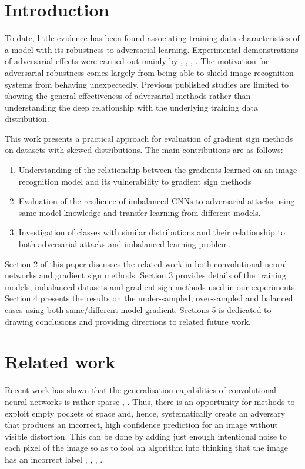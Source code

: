 \documentclass[runningheads,a4paper]{llncs}
\begin{document}
\section{Introduction}


To date, little evidence has been found associating training data characteristics of a model with its robustness to adversarial learning. Experimental demonstrations of adversarial effects were carried out mainly by \cite{billovits}, \cite{goodfellow2014}, \cite{goodfellow2016}, \cite{papernot2016}. The motivation for adversarial robustness comes largely from being able to shield image recognition systems from behaving unexpectedly. Previous published studies are limited to showing the general effectiveness of adversarial methods rather than understanding the deep relationship with the underlying training data distribution.

This work presents a practical approach for evaluation of gradient sign methods on datasets with skewed distributions. The main contributions are as follows:
\begin{enumerate}
\item Understanding of the relationship between the gradients learned on an image recognition model and its vulnerability to gradient sign methods
\item Evaluation of the resilience of imbalanced CNNs to adversarial attacks using same model knowledge and transfer learning from different models.
\item Investigation of classes with similar distributions and their relationship to both adversarial attacks and imbalanced learning problem.
\end{enumerate}

Section 2 of this paper discusses the related work in both convolutional neural networks and gradient sign methods. Section 3 provides details of the training models, imbalanced datasets and gradient sign methods used in our experiments. Section 4 presents the results on the under-sampled, over-sampled and balanced cases using both same/different model gradient. Sections 5 is dedicated to drawing conclusions and providing directions to related future work.
\section{Related work}


Recent work has shown that the generalisation capabilities of convolutional neural networks \cite{lawrence1997face} is rather sparse \cite{goodfellow2016}, \cite{papernot2016transf}. Thus, there is an opportunity for methods to exploit empty pockets of space and, hence, systematically create an adversary that produces an incorrect, high confidence prediction for an image without visible distortion. This can be done by adding just enough intentional noise to each pixel of the image so as to fool an algorithm into thinking that the image has an incorrect label \cite{goodfellow2014}, \cite{goodfellow2016}, \cite{papernot2016transf}, \cite{szegedy2013}.
\end{document}
